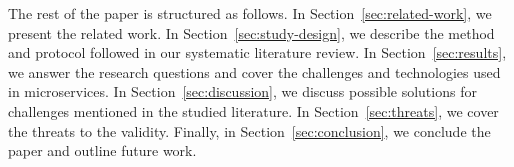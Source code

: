 The rest of the paper is structured as follows.
In Section~\ref{sec:related-work}, we present the related work.
In Section~\ref{sec:study-design}, we describe the method and protocol followed in our systematic literature review.
In Section~\ref{sec:results}, we answer the research questions and cover the challenges and technologies used in microservices.
In Section~\ref{sec:discussion}, we discuss possible solutions for challenges mentioned in the studied literature.
In Section~\ref{sec:threats}, we cover the threats to the validity.
Finally, in Section~\ref{sec:conclusion}, we conclude the paper and outline future work.



